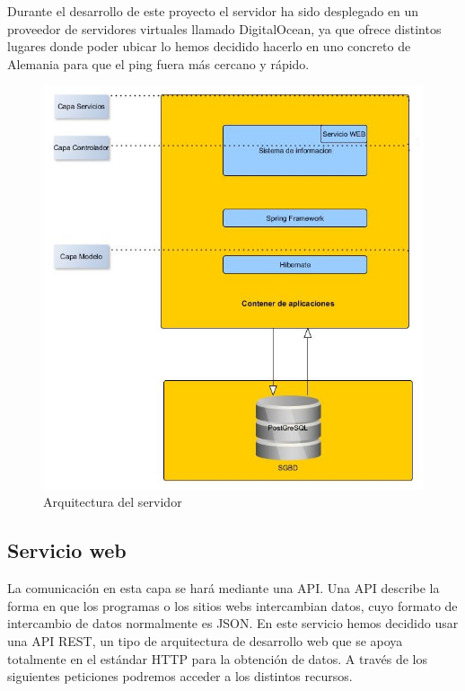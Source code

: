 Durante el desarrollo de este proyecto el servidor ha sido desplegado en un proveedor de servidores virtuales llamado 
  DigitalOcean, ya que ofrece distintos lugares donde poder ubicar lo hemos decidido hacerlo en uno concreto de Alemania para que el ping fuera más cercano y rápido.
\begin{figure}
		\centering
		\includegraphics[width=\textwidth] {arquitectura-servidor.jpg}
		\caption{Arquitectura del servidor }
		\label{fig:arquitectura-servidor}
	\end{figure}


\subsection{Servicio web}
 La comunicación en esta capa se hará mediante una API. Una API describe la forma en que los programas o los sitios webs intercambian datos, cuyo formato  de intercambio de datos normalmente es JSON. En este servicio hemos decidido usar una API REST, un tipo de arquitectura de desarrollo web que se apoya totalmente en el estándar HTTP para la obtención de datos. A través de los siguientes peticiones podremos acceder a los distintos recursos.
 

